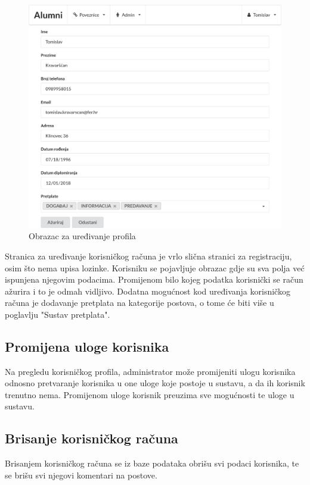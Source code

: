 \documentclass[zavrsni, numeric]{fer}
\begin{document}
\begin{figure}[H]
	\centering
	\includegraphics[width=13cm]{slike/uredi-profil.png}
	\caption{Obrazac za uređivanje profila}
	\label{fig:uredi-profil}
\end{figure}

Stranica za uređivanje korisničkog računa je vrlo slična stranici za registraciju, osim što nema upisa lozinke. Korisniku se pojavljuje obrazac gdje su sva polja već ispunjena njegovim podacima. Promijenom bilo kojeg podatka korisnički se račun ažurira i to je odmah vidljivo. Dodatna mogućnost kod uređivanja korisničkog računa je dodavanje pretplata na kategorije postova, o tome će biti više u poglavlju "Sustav pretplata".

\subsection{Promijena uloge korisnika}
Na pregledu korisničkog profila, administrator može promijeniti ulogu korisnika odnosno pretvaranje korisnika u one uloge koje postoje u sustavu, a da ih korisnik trenutno nema. Promijenom uloge korisnik preuzima sve mogućnosti te uloge u sustavu.

\subsection{Brisanje korisničkog računa}
Brisanjem korisničkog računa se iz baze podataka obrišu svi podaci korisnika, te se brišu svi njegovi komentari na postove.
\end{document}
